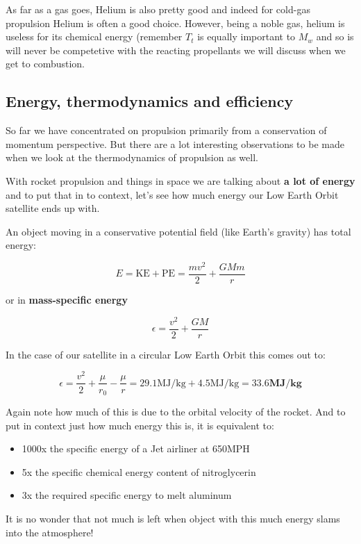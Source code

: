 \documentclass[11pt]{article}
\providecommand{\tightlist}{%
      \setlength{\itemsep}{0pt}\setlength{\parskip}{0pt}}
\begin{document}
As far as a gas goes, Helium is also pretty good and indeed for cold-gas
propulsion Helium is often a good choice. However, being a noble gas,
helium is useless for its chemical energy (remember \(T_t\) is equally
important to \(M_w\) and so is will never be competetive with the
reacting propellants we will discuss when we get to combustion.

    \subsection{Energy, thermodynamics and
efficiency}\label{energy-thermodynamics-and-efficiency}

So far we have concentrated on propulsion primarily from a conservation
of momentum perspective. But there are a lot interesting observations to
be made when we look at the thermodynamics of propulsion as well.

With rocket propulsion and things in space we are talking about
\textbf{a lot of energy} and to put that in to context, let's see how
much energy our Low Earth Orbit satellite ends up with.

An object moving in a conservative potential field (like Earth's
gravity) has total energy:

\[E = \text{KE} + \text{PE} = \frac{m v^2}{2} + \frac{GMm}{r}\]

or in \textbf{mass-specific energy}

\[\epsilon = \frac{v^2}{2} + \frac{GM}{r}\]

In the case of our satellite in a circular Low Earth Orbit this comes
out to:

\[\epsilon = \frac{v^2}{2} + \frac{\mu}{r_0} - \frac{\mu}{r} = 29.1 \text{MJ/kg} + 4.5 \text{MJ/kg} = \mathbf{33.6} \textbf{MJ/kg}\]

Again note how much of this is due to the orbital velocity of the
rocket. And to put in context just how much energy this is, it is
equivalent to:

\begin{itemize}
\tightlist
\item
  1000x the specific energy of a Jet airliner at 650MPH
\item
  5x the specific chemical energy content of nitroglycerin
\item
  3x the required specific energy to melt aluminum
\end{itemize}

It is no wonder that not much is left when object with this much energy
slams into the atmosphere!
\end{document}
